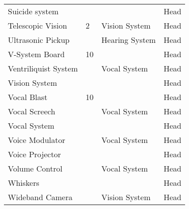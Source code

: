 \documentclass[twoside]{book}
\begin{document}
\begin{longtable}{p{1.25in}p{2em}ll}
  \raggedright
           Suicide system 
  &
  
  &
  
  &
   Head 
  \tabularnewline
      
  \raggedright
           Telescopic Vision 
  &
   2 
  &
   Vision System 
  &
   Head 
  \tabularnewline
      
  \raggedright
           Ultrasonic Pickup 
  &
  
  &
   Hearing System 
  &
   Head 
  \tabularnewline
      
  \raggedright
           V-System Board 
  &
   10 
  &
  
  &
   Head 
  \tabularnewline
      
  \raggedright
           Ventriliquist System 
  &
  
  &
   Vocal System 
  &
   Head 
  \tabularnewline
      
  \raggedright
           Vision System 
  &
  
  &
  
  &
   Head 
  \tabularnewline
      
  \raggedright
           Vocal Blast 
  &
   10 
  &
  
  &
   Head 
  \tabularnewline
      
  \raggedright
           Vocal Screech 
  &
  
  &
   Vocal System 
  &
   Head 
  \tabularnewline
      
  \raggedright
           Vocal System 
  &
  
  &
  
  &
   Head 
  \tabularnewline
      
  \raggedright
           Voice Modulator 
  &
  
  &
   Vocal System 
  &
   Head 
  \tabularnewline
      
  \raggedright
           Voice Projector 
  &
  
  &
  
  &
   Head 
  \tabularnewline
      
  \raggedright
           Volume Control 
  &
  
  &
   Vocal System 
  &
   Head 
  \tabularnewline
      
  \raggedright
           Whiskers 
  &
  
  &
  
  &
   Head 
  \tabularnewline
      
  \raggedright
           Wideband Camera 
  &
  
  &
   Vision System 
  &
   Head 
  \tabularnewline
      
\end{longtable}
    
\end{document}
